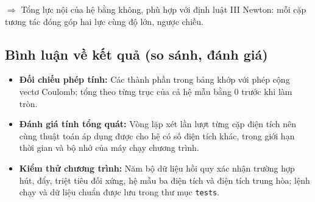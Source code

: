 $\Rightarrow$ Tổng lực nội của hệ bằng không, phù hợp với định luật III Newton: mỗi cặp tương tác đóng góp hai lực cùng độ lớn, ngược chiều.

\subsection{Bình luận về kết quả (so sánh, đánh giá)}
\begin{itemize}[leftmargin=1.2cm]
    \item \textbf{Đối chiếu phép tính:} Các thành phần trong bảng khớp với phép cộng vectơ Coulomb; tổng theo từng trục của cả hệ mẫu bằng $0$ trước khi làm tròn.
    \item \textbf{Đánh giá tính tổng quát:} Vòng lặp xét lần lượt từng cặp điện tích nên cùng thuật toán áp dụng được cho hệ có số điện tích khác, trong giới hạn thời gian và bộ nhớ của máy chạy chương trình.
    \item \textbf{Kiểm thử chương trình:} Năm bộ dữ liệu hồi quy xác nhận trường hợp hút, đẩy, triệt tiêu đối xứng, hệ mẫu ba điện tích và điện tích trung hòa; lệnh chạy và dữ liệu chuẩn được lưu trong thư mục \texttt{tests}.
\end{itemize}